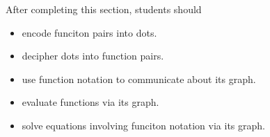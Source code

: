 \documentclass{ximera}
\begin{document}
\begin{sectionOutcomes}
After completing this section, students should 

\begin{itemize}
\item encode funciton pairs into dots.
\item decipher dots into function pairs.
\item use function notation to communicate about its graph.
\item evaluate functions via its graph.
\item solve equations involving funciton notation via its graph.
\end{itemize}
\end{sectionOutcomes}
\end{document}
